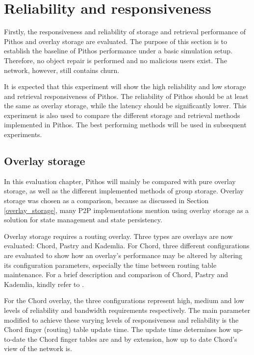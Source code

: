 \section{Reliability and responsiveness}

Firstly, the responsiveness and reliability of storage and retrieval performance of Pithos and overlay storage are evaluated. The purpose of this section is to establish the baseline of Pithos performance under a basic simulation setup. Therefore, no object repair is performed and no malicious users exist. The network, however, still contains churn.

It is expected that this experiment will show the high reliability and low storage and retrieval responsiveness of Pithos. The reliability of Pithos should be at least the same as overlay storage, while the latency should be significantly lower. This experiment is also used to compare the different storage and retrieval methods implemented in Pithos. The best performing methods will be used in subsequent experiments.

\subsection{Overlay storage}
\label{overlay_results}

In this evaluation chapter, Pithos will mainly be compared with pure overlay storage, as well as the different implemented methods of group storage. Overlay storage was chosen as a comparison, because as discussed in Section \ref{overlay_storage}, many P2P implementations mention using overlay storage as a solution for state management and state persistency.

Overlay storage requires a routing overlay. Three types are overlays are now evaluated: Chord, Pastry and Kademlia. For Chord, three different configurations are evaluated to show how an overlay's performance may be altered by altering its configuration parameters, especially the time between routing table maintenance. For a brief description and comparison of Chord, Pastry and Kademlia, kindly refer to \cite{overlay_survey}.

For the Chord overlay, the three configurations represent high, medium and low levels of reliability and bandwidth requirements respectively. The main parameter modified to achieve these varying levels of responsiveness and reliability is the Chord finger (routing) table update time. The update time determines how up-to-date the Chord finger tables are and by extension, how up to date Chord's view of the network is.

